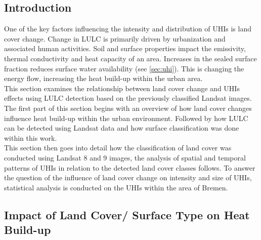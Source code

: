 \documentclass[12pt,a4paper, english,twoside]{scrartcl}
\begin{document}
    \subsection{Introduction}
      One of the key factors influencing the intensity and distribution of \glspl{UHI} is land cover change.
      Change in \gls{LULC} is primarily driven by urbanization and associated human activities.
      Soil and surface properties impact the emissivity, thermal conductivity and heat capacity of an area.
      Increases in the sealed surface fraction reduces surface water availability (see \cref{sec:uhi}).
      This is changing the energy flow, increasing the heat build-up within the urban area.
      \\    
      This section examines the relationship between land cover change and \glspl{UHI} effects using \gls{LULC} detection based on the previously classified Landsat images.
      The first part of this section begins with an overview of how land cover changes influence heat build-up within the urban environment. 
      Followed by how \gls{LULC} can be detected using Landsat data and how surface classification was done within this work. 
      \\
      This section then goes into detail how the classification of land cover was conducted using Landsat 8 and 9 images, the analysis of spatial and temporal patterns of \glspl{UHI} in relation to the detected land cover classes follows.
      To answer the question  of the influence of land cover change on intensity and size of \glspl{UHI}, statistical analysis is conducted on the \glspl{UHI} within the area of Bremen. \\
    \newpage
    \subsection{Impact of Land Cover/ Surface Type on Heat Build-up}

\end{document}
